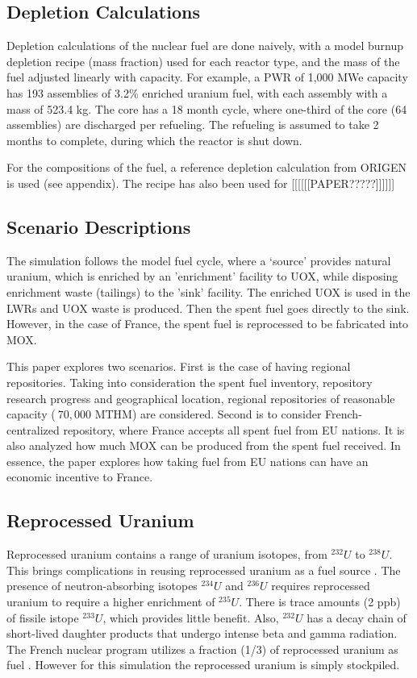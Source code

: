 \subsection{Depletion Calculations}
Depletion calculations of the nuclear fuel are done
naively, with a model burnup depletion recipe (mass fraction) used
for each reactor type, and the mass of the fuel 
adjusted linearly with capacity. For example, a PWR of
1,000 MWe capacity has 193 assemblies of 3.2\% enriched
uranium fuel, with each assembly with a mass of 523.4 kg.
The core has a 18 month cycle, where one-third of the 
core (64 assemblies) are discharged per refueling. The refueling
is assumed to take 2 months to complete, during which the reactor
is shut down. 

For the compositions of the fuel, a reference depletion calculation
from ORIGEN is used (see appendix). The recipe has also been used for
[[[[[[PAPER?????]]]]]]

\subsection{Scenario Descriptions}
The simulation follows the model fuel cycle, where a `source'
provides natural uranium, which is enriched by an 'enrichment'
facility to \gls{UOX}, while disposing enrichment waste (tailings)
to the 'sink' facility. The enriched \gls{UOX} is used
in the \gls{LWR}s and \gls{UOX} waste is produced. Then the spent fuel
goes directly to the sink. However, in the case of France, the spent fuel
is reprocessed to be fabricated into \gls{MOX}.


This paper explores two scenarios.
First is the case of having regional repositories. Taking into consideration 
the spent fuel inventory, repository research progress and geographical location,
regional repositories of reasonable capacity ($~70,000$ MTHM) are considered.
Second is to consider French-centralized repository, where France accepts all
spent fuel from EU nations. It is also analyzed how much \gls{MOX} can be produced
from the spent fuel received. In essence, the paper explores how taking fuel
from EU nations can have an economic incentive to France.



\subsection{Reprocessed Uranium}
Reprocessed uranium contains a range of uranium isotopes, from $^{232}U$ to $^{238}U$.
This brings complications in reusing reprocessed uranium as a fuel source \cite{IAEA_management_2007}.
The presence of neutron-absorbing isotopes $^{234}U$ and $^{236}U$ requires reprocessed uranium
to require a higher enrichment of $^{235}U$. There is trace amounts (2 ppb) of fissile istope $^{233}U$,
which provides little benefit.  
Also, $^{232}U$ has a decay chain of short-lived
daughter products that undergo intense beta and gamma radiation.
The French nuclear program utilizes a fraction (1/3) of reprocessed uranium as fuel \cite{IAEA_management_200&}.
However for this simulation the reprocessed uranium is simply stockpiled.


